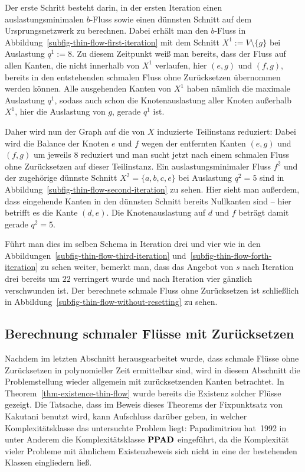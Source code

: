 \begin{example}
	Der erste Schritt besteht darin, in der ersten Iteration einen auslastungsminimalen $b$-Fluss sowie einen dünnsten Schnitt auf dem Ursprungsnetzwerk zu berechnen.
	Dabei erhält man den $b$-Fluss in Abbildung~\ref{subfig-thin-flow-first-iteration} mit dem Schnitt $X^1:= V \setminus \{ g \}$ bei Auslastung $q^1 := 8$.
	Zu diesem Zeitpunkt weiß man bereits, dass der Fluss auf allen Kanten, die nicht innerhalb von $X^1$ verlaufen, hier $(e,g)$ und $(f,g)$, bereits in den entstehenden schmalen Fluss ohne Zurücksetzen übernommen werden können.
	Alle ausgehenden Kanten von $X^1$ haben nämlich die maximale Auslastung $q^1$, sodass auch schon die Knotenauslastung aller Knoten außerhalb $X^1$, hier die Auslastung von $g$, gerade $q^1$ ist.

	Daher wird nun der Graph auf die von $X$ induzierte Teilinstanz reduziert:
	Dabei wird die Balance der Knoten $e$ und $f$ wegen der entfernten Kanten $(e,g)$ und $(f,g)$ um jeweils $8$ reduziert und man sucht jetzt nach einem schmalen Fluss ohne Zurücksetzen auf dieser Teilinstanz.
	Ein auslastungsminimaler Fluss $f^2$ und der zugehörige dünnste Schnitt $X^2 = \{ a, b, c, e \}$ bei Auslastung $q^2 = 5$ sind in Abbildung~\ref{subfig-thin-flow-second-iteration} zu sehen.
	Hier sieht man außerdem, dass eingehende Kanten in den dünnsten Schnitt bereits Nullkanten sind -- hier betrifft es die Kante $(d,e)$.
	Die Knotenauslastung auf $d$ und $f$ beträgt damit gerade $q^2=5$.
	
	Führt man dies im selben Schema in Iteration drei und vier wie in den Abbildungen~\ref{subfig-thin-flow-third-iteration} und~\ref{subfig-thin-flow-forth-iteration} zu sehen weiter, bemerkt man, dass das Angebot von $s$ nach Iteration drei bereits um $22$ verringert wurde und nach Iteration vier gänzlich verschwunden ist.
	Der berechnete schmale Fluss ohne Zurücksetzen ist schließlich in Abbildung~\ref{subfig-thin-flow-without-resetting} zu sehen.
\end{example}

\subsection{Berechnung schmaler Flüsse mit Zurücksetzen}

\newcommand{\EndOfTheLine}{\textit{\textsc{EndOfTheLine}}}

Nachdem im letzten Abschnitt herausgearbeitet wurde, dass schmale Flüsse ohne Zurücksetzen in polynomieller Zeit ermittelbar sind, wird in diesem Abschnitt die Problemstellung wieder allgemein mit zurücksetzenden Kanten betrachtet.
In Theorem~\ref{thm-existence-thin-flow} wurde bereits die Existenz solcher Flüsse gezeigt.
Die Tatsache, dass im Beweis dieses Theorems der Fixpunktsatz von Kakutani benutzt wird, kann Aufschluss darüber geben, in welcher Komplexitätsklasse das untersuchte Problem liegt:
Papadimitriou hat~1992 in~\cite{PPAD1994} unter Anderem die Komplexitätsklasse $\textbf{PPAD}$ eingeführt, da die Komplexität vieler Probleme mit ähnlichem Existenzbeweis sich nicht in eine der bestehenden Klassen eingliedern ließ.

